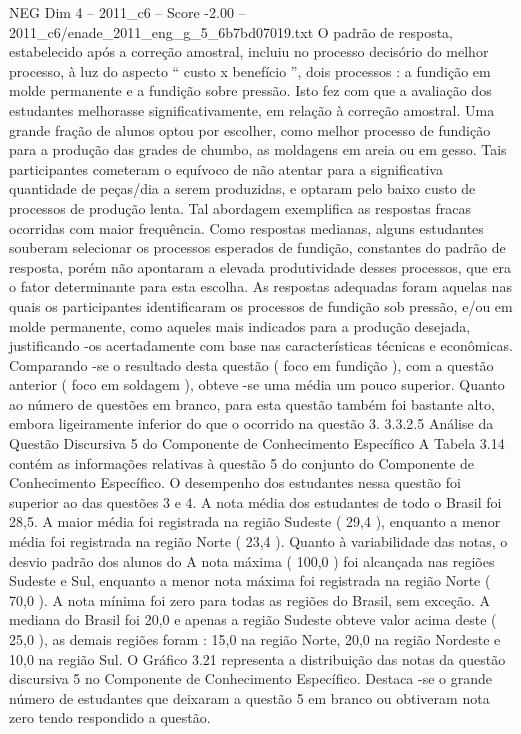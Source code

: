 \begin{textsample}{NEG Dim 4 – 2011\_c6 – Score -2.00 – 2011\_c6/enade\_2011\_eng\_g\_5\_6b7bd07019.txt}
O padrão de resposta, estabelecido após a correção amostral, incluiu no processo decisório do melhor processo, à luz do aspecto “ custo x benefício ”, dois processos : a fundição em molde permanente e a fundição sobre pressão.
Isto fez com que a avaliação dos estudantes melhorasse significativamente, em relação à correção amostral.
Uma grande fração de alunos optou por escolher, como melhor processo de fundição para a produção das grades de chumbo, as moldagens em areia ou em gesso.
Tais participantes cometeram o equívoco de não atentar para a significativa quantidade de peças/dia a serem produzidas, e optaram pelo baixo custo de processos de produção lenta.
Tal abordagem exemplifica as respostas fracas ocorridas com maior frequência.
Como respostas medianas, alguns estudantes souberam selecionar os processos esperados de fundição, constantes do padrão de resposta, porém não apontaram a elevada produtividade desses processos, que era o fator determinante para esta escolha.
As respostas adequadas foram aquelas nas quais os participantes identificaram os processos de fundição sob pressão, e/ou em molde permanente, como aqueles mais indicados para a produção desejada, justificando -os acertadamente com base nas características técnicas e econômicas.
Comparando -se o resultado desta questão ( foco em fundição ), com a questão anterior ( foco em soldagem ), obteve -se uma média um pouco superior.
Quanto ao número de questões em branco, para esta questão também foi bastante alto, embora ligeiramente inferior do que o ocorrido na questão 3. 3.3.2.5 Análise da Questão Discursiva 5 do Componente de Conhecimento Específico A Tabela 3.14 contém as informações relativas à questão 5 do conjunto do Componente de Conhecimento Específico.
O desempenho dos estudantes nessa questão foi superior ao das questões 3 e 4.
A nota média dos estudantes de todo o Brasil foi 28,5.
A maior média foi registrada na região Sudeste ( 29,4 ), enquanto a menor média foi registrada na região Norte ( 23,4 ).
Quanto à variabilidade das notas, o desvio padrão dos alunos do A nota máxima ( 100,0 ) foi alcançada nas regiões Sudeste e Sul, enquanto a menor nota máxima foi registrada na região Norte ( 70,0 ).
A nota mínima foi zero para todas as regiões do Brasil, sem exceção.
A mediana do Brasil foi 20,0 e apenas a região Sudeste obteve valor acima deste ( 25,0 ), as demais regiões foram : 15,0 na região Norte, 20,0 na região Nordeste e 10,0 na região Sul.
O Gráfico 3.21 representa a distribuição das notas da questão discursiva 5 no Componente de Conhecimento Específico.
Destaca -se o grande número de estudantes que deixaram a questão 5 em branco ou obtiveram nota zero tendo respondido a questão.

\end{textsample}
